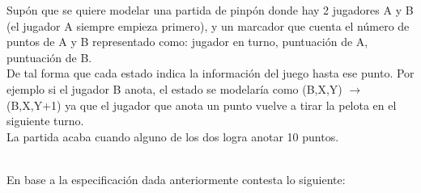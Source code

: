     \begin{exercise}
    
        Supón que se quiere modelar una partida de pinpón donde hay 2 jugadores A y B (el jugador A siempre empieza primero), y un marcador que cuenta el número de puntos de A y B representado como: jugador en turno, puntuación de A, puntuación de B. \\ 
   
        De tal forma que cada estado indica la información del juego hasta ese punto. Por ejemplo si el jugador B anota, el estado se modelaría como (B,X,Y) $\rightarrow$ (B,X,Y+1)  ya que el jugador que anota un punto vuelve a tirar la pelota en el siguiente turno.\\
    
        La partida acaba cuando alguno de los dos logra anotar 10 puntos. \\\

        En base a la especificación dada anteriormente contesta lo siguiente:\\


\end{exercise}
